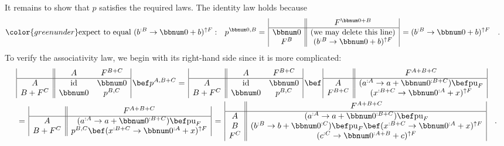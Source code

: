 It remains to show that $p$ satisfies the required laws. The identity
law holds because
\begin{align*}
{\color{greenunder}\text{expect to equal }(b^{:B}\rightarrow\bbnum 0+b)^{\uparrow F}:}\quad & p^{\bbnum 0,B}=\,\begin{array}{|c||c|}
 & F^{\bbnum 0+B}\\
\hline \bbnum 0 & \text{(we may delete this line)}\\
F^{B} & (b^{:B}\rightarrow\bbnum 0+b)^{\uparrow F}
\end{array}\,=(b^{:B}\rightarrow\bbnum 0+b)^{\uparrow F}\quad.
\end{align*}
To verify the associativity law, we begin with its right-hand side
since it is more complicated:
\begin{align*}
 & \begin{array}{|c||cc|}
 & A & F^{B+C}\\
\hline A & \text{id} & \bbnum 0\\
B+F^{C} & \bbnum 0 & p^{B,C}
\end{array}\,\bef p^{A,B+C}=\,\begin{array}{|c||cc|}
 & A & F^{B+C}\\
\hline A & \text{id} & \bbnum 0\\
B+F^{C} & \bbnum 0 & p^{B,C}
\end{array}\,\bef\,\begin{array}{|c||c|}
 & F^{A+B+C}\\
\hline A & (a^{:A}\rightarrow a+\bbnum 0^{:B+C})\bef\text{pu}_{F}\\
F^{B+C} & (x^{:B+C}\rightarrow\bbnum 0^{:A}+x)^{\uparrow F}
\end{array}\\
 & =\,\begin{array}{|c||c|}
 & F^{A+B+C}\\
\hline A & (a^{:A}\rightarrow a+\bbnum 0^{:B+C})\bef\text{pu}_{F}\\
B+F^{C} & p^{B,C}\bef(x^{:B+C}\rightarrow\bbnum 0^{:A}+x)^{\uparrow F}
\end{array}\,=\,\begin{array}{|c||c|}
 & F^{A+B+C}\\
\hline A & (a^{:A}\rightarrow a+\bbnum 0^{:B+C})\bef\text{pu}_{F}\\
B & (b^{:B}\rightarrow b+\bbnum 0^{:C})\bef\text{pu}_{F}\bef(x^{:B+C}\rightarrow\bbnum 0^{:A}+x)^{\uparrow F}\\
F^{C} & (c^{:C}\rightarrow\bbnum 0^{:A+B}+c)^{\uparrow F}
\end{array}\quad.
\end{align*}
